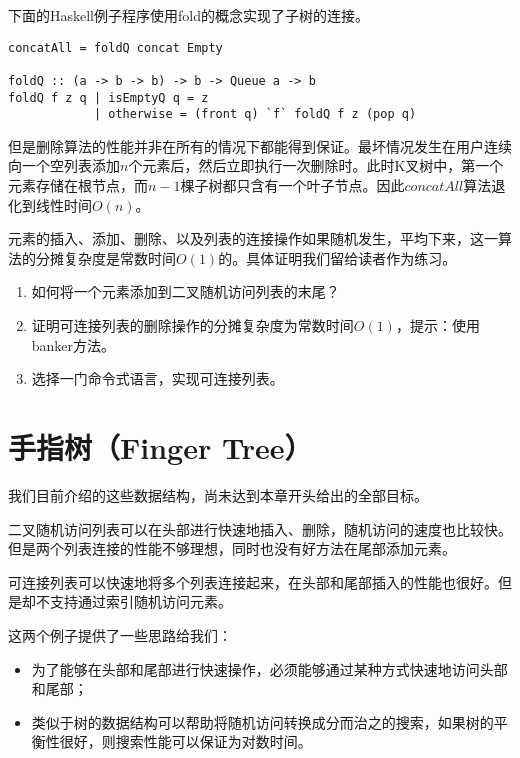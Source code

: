 \documentclass[UTF8]{article}
\begin{document}
下面的Haskell例子程序使用fold的概念实现了子树的连接。

\begin{lstlisting}[style=Haskell]
concatAll = foldQ concat Empty

foldQ :: (a -> b -> b) -> b -> Queue a -> b
foldQ f z q | isEmptyQ q = z
            | otherwise = (front q) `f` foldQ f z (pop q)
\end{lstlisting}

但是删除算法的性能并非在所有的情况下都能得到保证。最坏情况发生在用户连续向一个空列表添加$n$个元素后，然后立即执行一次删除时。此时K叉树中，第一个元素存储在根节点，而$n-1$棵子树都只含有一个叶子节点。因此$concatAll$算法退化到线性时间$O(n)$。

元素的插入、添加、删除、以及列表的连接操作如果随机发生，平均下来，这一算法的分摊复杂度是常数时间$O(1)$的。具体证明我们留给读者作为练习。

\begin{Exercise}
\begin{enumerate}
\item 如何将一个元素添加到二叉随机访问列表的末尾？

\item 证明可连接列表的删除操作的分摊复杂度为常数时间$O(1)$，提示：使用banker方法。

\item 选择一门命令式语言，实现可连接列表。
\end{enumerate}
\end{Exercise}

\section{手指树（Finger Tree）}
我们目前介绍的这些数据结构，尚未达到本章开头给出的全部目标。

二叉随机访问列表可以在头部进行快速地插入、删除，随机访问的速度也比较快。但是两个列表连接的性能不够理想，同时也没有好方法在尾部添加元素。

可连接列表可以快速地将多个列表连接起来，在头部和尾部插入的性能也很好。但是却不支持通过索引随机访问元素。

这两个例子提供了一些思路给我们：

\begin{itemize}
\item 为了能够在头部和尾部进行快速操作，必须能够通过某种方式快速地访问头部和尾部；
\item 类似于树的数据结构可以帮助将随机访问转换成分而治之的搜索，如果树的平衡性很好，则搜索性能可以保证为对数时间。
\end{itemize}
\end{document}
